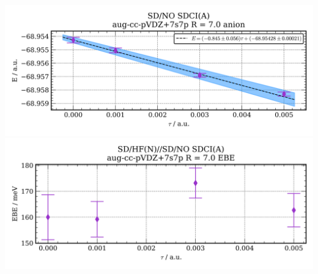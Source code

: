 \includegraphics[width=\textwidth,keepaspectratio]{images/SDshivHFupaNapushivshivSDshivNO_SDCIupaAapu__aug-cc-pvdz+7s7p__7p0_02_anion.png}
\includegraphics[width=\textwidth,keepaspectratio]{images/SDshivHFupaNapushivshivSDshivNO_SDCIupaAapu__aug-cc-pvdz+7s7p__7p0_03_ebe.png}
\newpage
